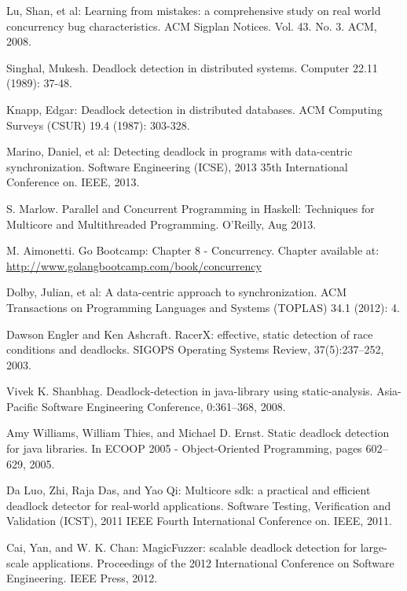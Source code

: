 \begin{thebibliography}{4}

 Lu, Shan, et al: Learning from mistakes: a comprehensive study on real world concurrency bug characteristics.
ACM Sigplan Notices. Vol. 43. No. 3. ACM, 2008.

 Singhal, Mukesh. Deadlock detection in distributed systems.
Computer 22.11 (1989): 37-48.

 Knapp, Edgar: Deadlock detection in distributed databases.
ACM Computing Surveys (CSUR) 19.4 (1987): 303-328.

 Marino, Daniel, et al: Detecting deadlock in programs with data-centric synchronization.
Software Engineering (ICSE), 2013 35th International Conference on. IEEE, 2013.

 S. Marlow. Parallel and Concurrent Programming in Haskell: Techniques for Multicore and Multithreaded Programming. O'Reilly, Aug 2013.

 M. Aimonetti. Go Bootcamp: Chapter 8 - Concurrency. Chapter available at: \url{http://www.golangbootcamp.com/book/concurrency}

 Dolby, Julian, et al: A data-centric approach to synchronization.
ACM Transactions on Programming Languages and Systems (TOPLAS) 34.1 (2012): 4.

 Dawson Engler and Ken Ashcraft. RacerX: effective, static detection of race conditions and
deadlocks. SIGOPS Operating Systems Review, 37(5):237–252, 2003.

 Vivek K. Shanbhag. Deadlock-detection in java-library using static-analysis. Asia-Pacific
Software Engineering Conference, 0:361–368, 2008.

 Amy Williams, William Thies, and Michael D. Ernst. Static deadlock detection for java
libraries. In ECOOP 2005 - Object-Oriented Programming, pages 602–629, 2005.

 Da Luo, Zhi, Raja Das, and Yao Qi: Multicore sdk: a practical and efficient deadlock detector for real-world applications.
Software Testing, Verification and Validation (ICST), 2011 IEEE Fourth International Conference on. IEEE, 2011.

 Cai, Yan, and W. K. Chan: MagicFuzzer: scalable deadlock detection for large-scale applications.
Proceedings of the 2012 International Conference on Software Engineering. IEEE Press, 2012.


\end{thebibliography}
